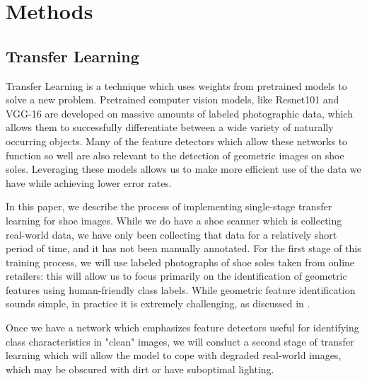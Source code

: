 \documentclass[10pt]{article}
\newcommand{\svp}[1]{{\textcolor{RedOrange}{#1}}}
\begin{document}
\section{Methods}

\subsection{Transfer Learning}
Transfer Learning is a technique \svp{which} uses weights from pretrained models to solve a new problem. Pretrained \svp{computer vision} models, like Resnet101 \svp{and} VGG-16 \svp{are developed} on massive \svp{amounts of labeled photographic} data\svp{, which allows them to successfully differentiate between a wide variety of naturally occurring objects}. \svp{Many of the feature detectors which allow these networks to function so well are also relevant to the detection of geometric images on shoe soles.} \svp{Leveraging} these models \svp{allows us to make more efficient use of the data we have} while achieving lower error rates. 

\svp{In this paper, we describe the process of implementing single-stage transfer learning for shoe images. While we do have a shoe scanner which is collecting real-world data, we have only been collecting that data for a relatively short period of time, and it has not been manually annotated. For the first stage of this training process, we will use labeled photographs of shoe soles taken from online retailers: this will allow us to focus primarily on the identification of geometric features using human-friendly class labels. While geometric feature identification sounds simple, in practice it is extremely challenging, as discussed in \Cref{sec:classification-scheme}.}


\svp{Once we have a network which emphasizes feature detectors useful for identifying class characteristics in "clean" images, we will conduct a second stage of transfer learning which will allow the model to cope with degraded real-world images, which may be obscured with dirt or have suboptimal lighting.}
\end{document}
